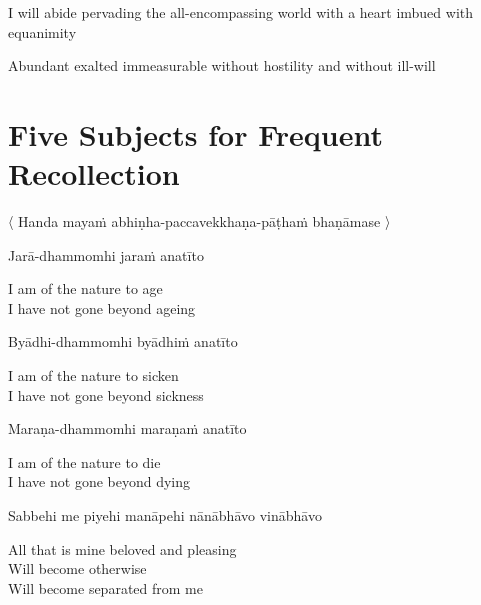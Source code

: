 \begin{english-hang}
I will abide pervading the all-encompassing world with a heart imbued with equanimity\\
\end{english-hang}

\begin{english-hang}
Abundant exalted immeasurable without hostility and without ill-will
\end{english-hang}

\suttaRef{[DN 13]}


\section{Five Subjects for Frequent Recollection}
\label{five-recollections}

\begin{leader}
  〈 Handa mayaṁ abhiṇha-paccavekkhaṇa-pāṭhaṁ bhaṇāmase 〉
\end{leader}

Jarā-dhammomhi jaraṁ anatīto

\begin{english}
  I am of the nature to age\\
  I have not gone beyond ageing
\end{english}

Byādhi-dhammomhi byādhiṁ anatīto

\begin{english}
  I am of the nature to sicken\\
  I have not gone beyond sickness
\end{english}

Maraṇa-dhammomhi maraṇaṁ anatīto

\begin{english}
  I am of the nature to die\\
  I have not gone beyond dying
\end{english}

Sabbehi me piyehi manāpehi nānābhāvo vinābhāvo

\begin{english}
  All that is mine beloved and pleasing\\
  Will become otherwise\\
  Will become separated from me
\end{english}

\vspace{8pt}

